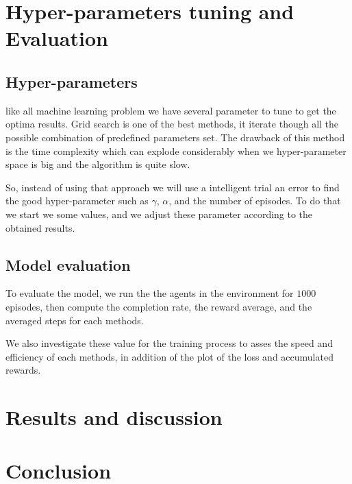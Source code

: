 \section{Hyper-parameters tuning and Evaluation}
\subsection{Hyper-parameters}
like all machine learning problem we have several parameter to tune to get the optima results. Grid search is one of the best methods, it iterate though all the possible combination of predefined parameters set. The drawback of this method is the time complexity which can explode considerably when we hyper-parameter space is big and the algorithm is quite slow.

So, instead of using that approach we will use a intelligent trial an error to find the good hyper-parameter such as $\gamma$, $\alpha$, and the number of episodes. To do that we start we some values, and we adjust these parameter according to the obtained results.

\subsection{Model evaluation}
To evaluate the model, we run the the agents in the environment for $1000$ episodes, then compute the completion rate, the reward average, and the averaged steps for each methods.

We also investigate these value for the training process to asses the speed and efficiency of each methods, in addition of the plot of the loss and accumulated rewards.
\section{Results and discussion}
\section{Conclusion}
